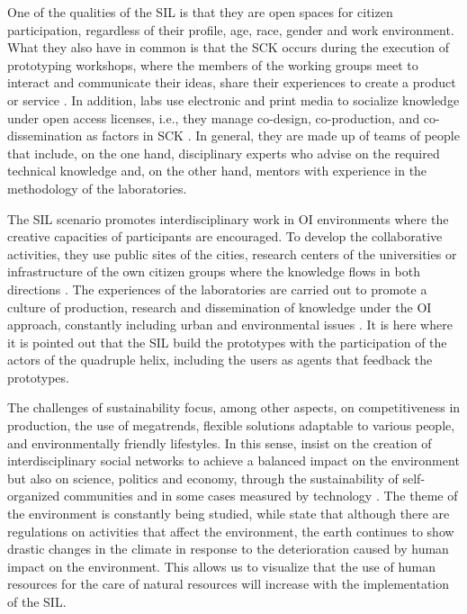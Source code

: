 \documentclass[english]{textolivre}
\begin{document}
One of the qualities of the SIL is that they are open spaces for citizen participation, regardless of their profile, age, race, gender and work environment. What they also have in common is that the SCK occurs during the execution of prototyping workshops, where the members of the working groups meet to interact and communicate their ideas, share their experiences to create a product or service \cite{pettibone2018, garcia+lopez2020, krause2019}. In addition, labs use electronic and print media to socialize knowledge under open access licenses, i.e., they manage co-design, co-production, and co-dissemination as factors in SCK \cite{blattel2016, evans2015, alonso2020}. In general, they are made up of teams of people that include, on the one hand, disciplinary experts who advise on the required technical knowledge and, on the other hand, mentors with experience in the methodology of the laboratories.

The SIL scenario promotes interdisciplinary work in OI environments where the creative capacities of participants are encouraged. To develop the collaborative activities, they use public sites of the cities, research centers of the universities or infrastructure of the own citizen groups where the knowledge flows in both directions \cite{fasnacht2009, paschke2019, baran2020}. The experiences of the laboratories are carried out to promote a culture of production, research and dissemination of knowledge under the OI approach, constantly including urban and environmental issues \cite{raasch2009, oberlack2019, barbancho2020}. It is here where it is pointed out that the SIL build the prototypes with the participation of the actors of the quadruple helix, including the users as agents that feedback the prototypes.

The challenges of sustainability focus, among other aspects, on competitiveness in production, the use of megatrends, flexible solutions adaptable to various people, and environmentally friendly lifestyles. In this sense, \textcite{wang2020, peduzzi2020} insist on the creation of interdisciplinary social networks to achieve a balanced impact on the environment but also on science, politics and economy, through the sustainability of self-organized communities and in some cases measured by technology \cite{mikhak2002}. The theme of the environment is constantly being studied, while \textcite{zambrano2020, castro2020, estevez-alvarez2020} state that although there are regulations on activities that affect the environment, the earth continues to show drastic changes in the climate in response to the deterioration caused by human impact on the environment. This allows us to visualize that the use of human resources for the care of natural resources will increase with the implementation of the SIL.
\end{document}

